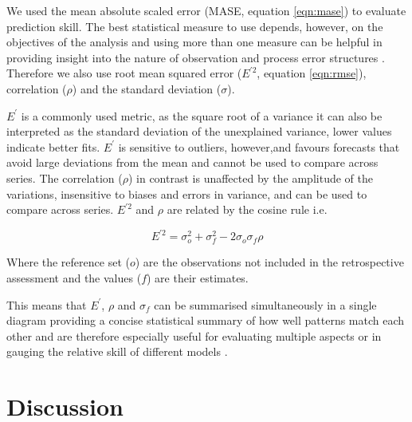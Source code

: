\documentclass[12pt,halfline,a4paper,nonumbib]{ouparticle}
\begin{document}
We used the mean absolute scaled error (MASE, equation \ref{eqn:mase}) to evaluate prediction skill. The best statistical measure to use depends, however, on the objectives of the analysis and using more than one measure can be helpful in providing insight into the nature of observation and process error structures \parencite{kell2016xval}. Therefore we also use root mean squared error ($E^{\prime 2}$, equation \ref{eqn:rmse}), correlation ($\rho$) and the standard deviation ($\sigma$). 

$E^\prime$ is a commonly used metric, as the square root of a variance it can also be interpreted as the standard deviation of the unexplained variance,  lower values indicate better fits. $E^\prime$ is sensitive to outliers, however,and favours forecasts that avoid large deviations from the mean and cannot be used to compare across series. The correlation ($\rho$) in contrast is unaffected by the amplitude of the variations, insensitive to biases and errors in variance, and can be used to compare across series. $E^{\prime 2}$ and $\rho$ are related by the cosine rule i.e.

 \begin{equation} 
 E^{\prime 2} = \sigma_o^2 + \sigma_f^2 - 2\sigma_o\sigma_f\rho
 \end{equation}

Where the reference set ($o$) are the observations not included in the retrospective assessment and the values ($f$) are their estimates. 
 
This means that $E^\prime$, $\rho$ and $\sigma_f$ can be summarised simultaneously in a single diagram\parencite{taylor2001summarizing} providing a concise statistical summary of how well patterns match each other and are therefore especially useful for evaluating multiple aspects or in gauging the relative skill of different models \parencite{griggs2002climate}.

\section{Discussion}
\end{document}
